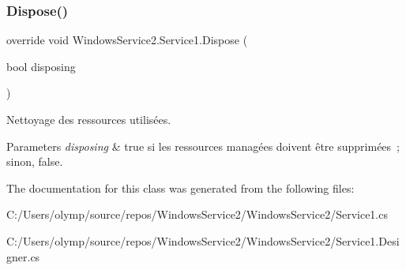 \subsubsection{\texorpdfstring{Dispose()}{Dispose()}}
{\footnotesize\ttfamily override void Windows\+Service2.\+Service1.\+Dispose (\begin{DoxyParamCaption}\item[{bool}]{disposing }\end{DoxyParamCaption})\hspace{0.3cm}{\ttfamily [protected]}}



Nettoyage des ressources utilisées. 


\begin{DoxyParams}{Parameters}
{\em disposing} & true si les ressources managées doivent être supprimées ; sinon, false.\\
\hline
\end{DoxyParams}


The documentation for this class was generated from the following files\+:\begin{DoxyCompactItemize}
\item 
C\+:/\+Users/olymp/source/repos/\+Windows\+Service2/\+Windows\+Service2/Service1.\+cs\item 
C\+:/\+Users/olymp/source/repos/\+Windows\+Service2/\+Windows\+Service2/Service1.\+Designer.\+cs\end{DoxyCompactItemize}
